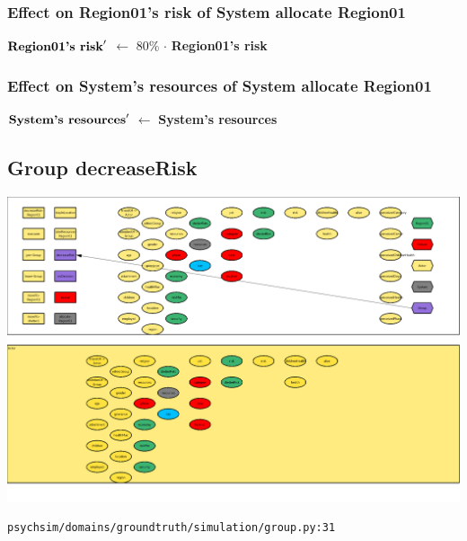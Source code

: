 \documentclass{article}%
\begin{document}
%
\subsubsection{Effect on Region01's risk of System allocate Region01}%
\label{ssubsec:Effect on Region01's risk of System allocate Region01}%
\begin{flushleft}%
$\mbox{\textbf{Region01's risk}} '$%
$\leftarrow$%
80\%%
$\cdot$%
\textbf{Region01's risk}%
\end{flushleft}

%
\subsubsection{Effect on System's resources of System allocate Region01}%
\label{ssubsec:Effect on System's resources of System allocate Region01}%
\begin{flushleft}%
$\mbox{\textbf{System's resources}} '$%
$\leftarrow$%
\textbf{System's resources}%
\end{flushleft}

%
\subsection{Group decreaseRisk}%
\label{subsec:Group decreaseRisk}%
\includegraphics[width=\textwidth]{images/Group-decreaseRisk.png}%
\begin{flushleft}%
\verb|psychsim/domains/groundtruth/simulation/group.py:31|%
\end{flushleft}

%
\end{document}
